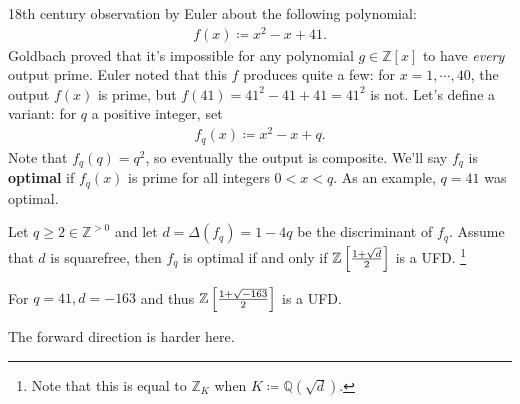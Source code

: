 \begin{remark}

18th century observation by Euler about the following polynomial:
\begin{align*}
f(x) \coloneqq x^2 -x + 41 
.\end{align*}
Goldbach proved that it's impossible for any polynomial
\(g\in {\mathbb{Z}}[x]\) to have \emph{every} output prime. Euler noted
that this \(f\) produces quite a few: for \(x=1, \cdots, 40\), the
output \(f(x)\) is prime, but \(f(41) = 41^2 - 41 + 41 = 41^2\) is not.
Let's define a variant: for \(q\) a positive integer, set
\begin{align*}
f_q(x) \coloneqq x^2 - x + q
.\end{align*}
Note that \(f_q(q) = q^2\), so eventually the output is composite. We'll
say \(f_q\) is \textbf{optimal} if \(f_q(x)\) is prime for all integers
\(0 < x < q\). As an example, \(q=41\) was optimal.

\end{remark}

\begin{theorem}[Rabonowitch]

Let \(q \geq 2 \in {\mathbb{Z}}^{> 0}\) and let
\(d = \Delta(f_q) = 1-4q\) be the discriminant of \(f_q\). Assume that
\(d\) is squarefree, then \(f_q\) is optimal if and only if
\(\mathbb{Z}\left[ { {1 + \sqrt{d}\over 2 }} \right]\) is a UFD.
\footnote{Note that this is equal to \({\mathbb{Z}}_K\) when
  \(K\coloneqq{\mathbb{Q}}( \sqrt{d} )\).}

\end{theorem}

\begin{example}[?]

For \(q=41, d = -163\) and thus
\(\mathbb{Z}\left[ { {1 + \sqrt{-163} \over 2}} \right]\) is a UFD.

\end{example}

\begin{remark}

The forward direction is harder here.

\end{remark}

